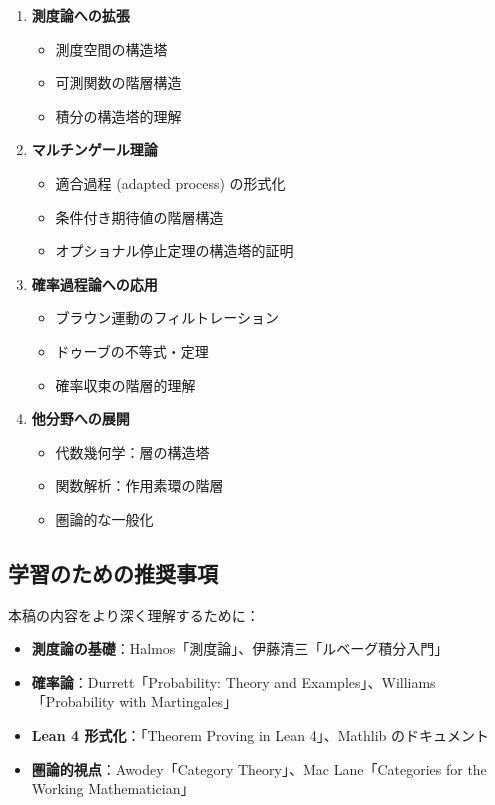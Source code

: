 \documentclass[a4paper,12pt]{ltjsarticle}
\theoremstyle{definition}
\begin{document}
\begin{enumerate}
  \item \textbf{測度論への拡張}
  \begin{itemize}
    \item 測度空間の構造塔
    \item 可測関数の階層構造
    \item 積分の構造塔的理解
  \end{itemize}

  \item \textbf{マルチンゲール理論}
  \begin{itemize}
    \item 適合過程 (adapted process) の形式化
    \item 条件付き期待値の階層構造
    \item オプショナル停止定理の構造塔的証明
  \end{itemize}

  \item \textbf{確率過程論への応用}
  \begin{itemize}
    \item ブラウン運動のフィルトレーション
    \item ドゥーブの不等式・定理
    \item 確率収束の階層的理解
  \end{itemize}

  \item \textbf{他分野への展開}
  \begin{itemize}
    \item 代数幾何学：層の構造塔
    \item 関数解析：作用素環の階層
    \item 圏論的な一般化
  \end{itemize}
\end{enumerate}

\subsection{学習のための推奨事項}

本稿の内容をより深く理解するために：

\begin{itemize}
  \item \textbf{測度論の基礎}：Halmos「測度論」、伊藤清三「ルベーグ積分入門」
  \item \textbf{確率論}：Durrett「Probability: Theory and Examples」、Williams「Probability with Martingales」
  \item \textbf{Lean 4 形式化}：「Theorem Proving in Lean 4」、Mathlib のドキュメント
  \item \textbf{圏論的視点}：Awodey「Category Theory」、Mac Lane「Categories for the Working Mathematician」
\end{itemize}
\end{document}
